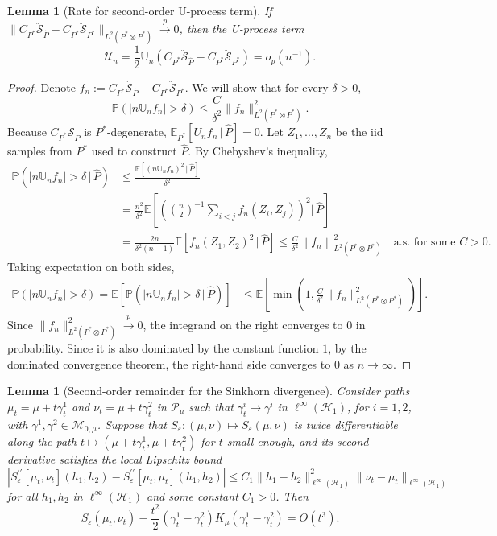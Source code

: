 \documentclass{article}
\theoremstyle{plain}
\newtheorem{lemma}[theorem]{Lemma}
\theoremstyle{definition}
\theoremstyle{remark}
\newcommand{\E}{\mathbb{E}}
\newcommand{\U}{\mathbb{U}}
\newcommand{\Prob}{\mathbb{P}}
\newcommand{\of}[1]{\left(#1\right)}
\newcommand{\off}[1]{\left[#1\right]}
\newcommand{\abs}[1]{\left|#1\right|}
\newcommand{\cH}{\mathcal{H}}
\newcommand{\cP}{\mathcal{P}}
\newcommand{\cM}{\mathcal{M}}
\newcommand{\ucU}{\mathscr{U}}
\newcommand{\hP}{\widehat{P}}
\newcommand{\1}{\mathbbm{1}}
\newcommand{\STE}{\mathscr{S}}
\newcommand{\eps}{\varepsilon}
\newcommand{\norm}[1]{\left \| #1 \right \|}
\theoremstyle{plain}
\theoremstyle{definition}
\newcommand{\mymid}{\,|\,}
\begin{document}
\begin{lemma}[Rate for second-order U-process term]\label{lem:U-process_term}
    If $\|C_{P^*} \ddot{\STE}_{\hP} - C_{P^*} \ddot{\STE}_{P^*}\|_{L^2(P^* \otimes P^*)} \xrightarrow[]{p} 0$, then the U-process term
    \[
    \ucU_n = \frac{1}{2} \U_n \of{C_{P^*} \ddot{\STE}_{\hP} - C_{P^*} \ddot{\STE}_{P^*}} = o_p(n^{-1}).
    \]
\end{lemma}
\begin{proof}
    Denote $f_n := C_{P^*} \ddot{\STE}_{\hP} - C_{P^*} \ddot{\STE}_{P^*}$. We will show that for every $\delta > 0$,
    \[
    \Prob\of{\abs{n \U_n f_n} > \delta} \leq \frac{C }{\delta^2} {\|f_n\|^2_{L^2(P^* \otimes P^*)}}.
    \]
    Because $C_{P^*} \ddot{\STE}_{\hP}$ is $P^*$-degenerate, $\E_{P^*} \off{U_n f_n \mymid \hP} = 0$. Let $Z_1, \dots, Z_n$ be the iid samples from $P^*$ used to construct $\hP$. By Chebyshev's inequality,
    \begin{align*}
        \Prob\of{\abs{n \U_n f_n} > \delta \mymid \hP} & \leq \frac{\E\off{(n \U_n f_n)^2 \mymid \hP}}{\delta^2}\\
        &=\frac{n^2}{\delta^2} \E\off{ \of{ {n \choose 2}^{-1} \sum_{i < j} f_n (Z_i, Z_j)}^2 \Big\vert \, \hP}\\
        &= \frac{2n}{\delta^2 (n-1)} \E\off{ f_n(Z_1, Z_2)^2 \mymid \hP} \leq \frac{C}{\delta^2} \norm{f_n}_{L^2(P^* \otimes P^*)}^2 \quad \text{a.s. for some } C>0.
    \end{align*}
    Taking expectation on both sides,
    \begin{align*}
        \Prob\of{\abs{n \U_n f_n} > \delta } = \E\off{\Prob\of{\abs{n \U_n f_n} > \delta \mymid \hP}} &\leq \E\off{\min\of{1, \frac{C}{\delta^2} \|f_n\|^2_{L^2(P^* \otimes P^*)}}}. 
    \end{align*}
    Since $\|f_n\|^2_{L^2(P^* \otimes P^*)} \xrightarrow[]{p} 0$, the integrand on the right converges to $0$ in probability. Since it is also dominated by the constant function $1$, by the dominated convergence theorem, the right-hand side converges to $0$ as $n\to\infty$.
\end{proof}

\begin{lemma}[Second-order remainder for the Sinkhorn divergence]
\label{lem:sinkhorn_second_order_remainder}
Consider paths $\mu_t=\mu+t\gamma_t^1$ and $\nu_t=\mu+t\gamma_t^2$ in $\cP_\mu$ such that $\gamma_t^i\to \gamma^i$ in $\ell^\infty(\cH_1)$, for
$i=1,2$, with $\gamma^1,\gamma^2\in \cM_{0,\mu}$. Suppose that $S_\eps: (\mu, \nu) \mapsto S_\eps(\mu, \nu)$
is twice differentiable along the path $t \mapsto (\mu+t\gamma_t^1,\mu+t\gamma_t^2)$ for $t$ small enough, and its second derivative satisfies the local
Lipschitz bound
\[
\left|
S_\eps^{\prime\prime}[\mu_t, \nu_t](h_1,h_2)
-
S_\eps^{\prime\prime}[\mu_t,\mu_t](h_1,h_2)
\right|
\leq
C_1 \|h_1-h_2\|^2_{\ell^\infty(\cH_1)} \|\nu_t-\mu_t\|_{\ell^\infty(\cH_1)}
\]
for all $h_1,h_2$ in $\ell^\infty(\mathcal H_1)$ and some constant $C_1>0$. Then
\[
    S_\eps(\mu_t,\nu_t)
    -
    \frac{t^2}{2}
    (\gamma_t^1-\gamma_t^2)K_\mu(\gamma_t^1-\gamma_t^2)
    =
    O(t^3).
\]
\end{lemma}
\end{document}
